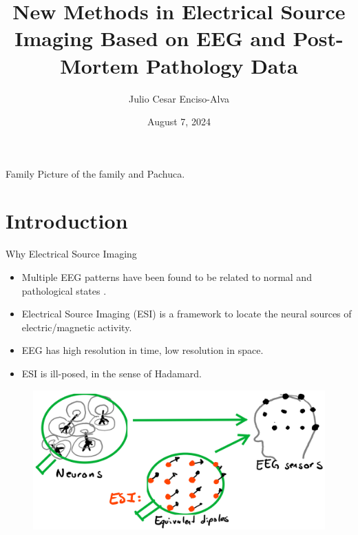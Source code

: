 \documentclass[progressbar=head]{beamer}
\title{New Methods in Electrical Source Imaging Based on EEG and Post-Mortem Pathology Data}
\date{August 7, 2024}
\author{Julio Cesar Enciso-Alva}
\institute{University   of Texas at Arlington}
\begin{document}



{
\maketitle

\begin{frame}%
\tableofcontents[pausesections]
\end{frame}
}


\begin{frame}{Family}
Picture of the family and Pachuca.
\end{frame}


{
\section{Introduction}
}

\begin{frame}{Why Electrical Source Imaging}
\begin{itemize}
\item Multiple EEG patterns have been found to be related to normal and pathological states . 
\item Electrical Source Imaging (ESI) is a framework to locate the neural sources of electric/magnetic activity.
\item EEG has high resolution in time, low resolution in space. 
\item ESI is ill-posed, in the sense of Hadamard.
\end{itemize}
\begin{figure}
\centering
\includegraphics[width=0.6\linewidth]{./img_oldbeamer/sketch03}
\end{figure}
\end{frame}
\end{document}
